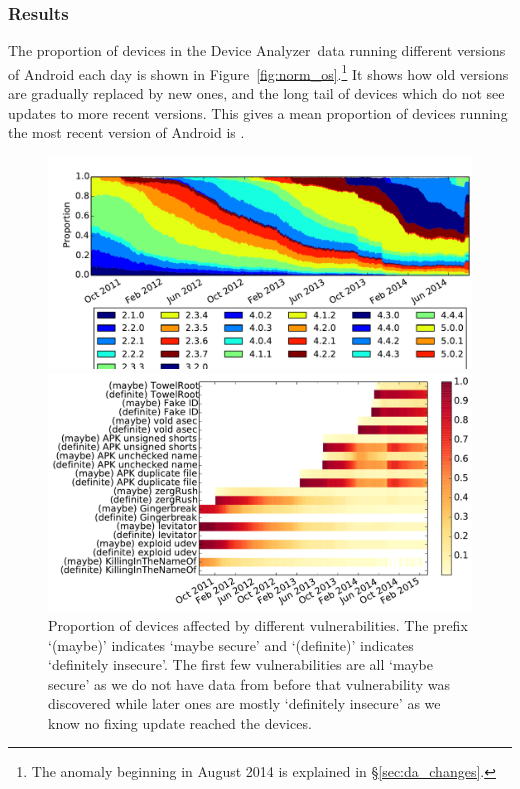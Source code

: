 \documentclass{llncs}
\newcommand{\da}{Device Analyzer}
\begin{document}
\subsubsection{Results}
The proportion of devices in the \da\ data running different versions of Android each day is shown in Figure~\ref{fig:norm_os}.\footnote{The anomaly beginning in August 2014 is explained in \S\ref{sec:da_changes}.}
It shows how old versions are gradually replaced by new ones, and the long tail of devices which do not see updates to more recent versions.
This gives a mean proportion of devices running the most recent version of Android is \daUpdatednessPerc.


\begin{figure}[!h]
 \centering
 \includegraphics[width=\textwidth]{figures/da_norm_os}
 \caption{Android versions in \da\ data over time. The anomaly beginning in August 2014 is explained in \S\ref{sec:da_changes}.}
 \label{fig:norm_os}
 \includegraphics[width=\textwidth]{figures/nvulnerabilities_heat.pdf}
 \caption{Proportion of devices affected by different vulnerabilities. The prefix `(maybe)' indicates `maybe secure' and `(definite)' indicates `definitely insecure'. The first few vulnerabilities are all `maybe secure' as we do not have data from before that vulnerability was discovered while later ones are mostly `definitely insecure' as we know no fixing update reached the devices.
 }
 \label{fig:nvulnerabilities_heat}
\end{figure}
\end{document}
